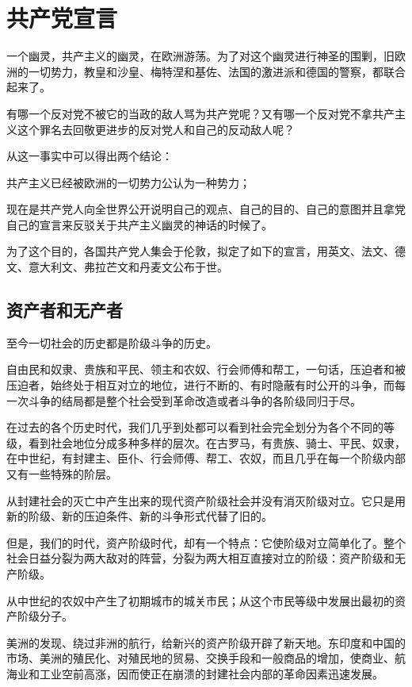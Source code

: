 
\usepackage{../../lectures_preamble}


    \section{共产党宣言}
    一个幽灵，共产主义的幽灵，在欧洲游荡。为了对这个幽灵进行神圣的围剿，旧欧洲的一切势力，教皇和沙皇、梅特涅和基佐、法国的激进派和德国的警察，都联合起来了。

    有哪一个反对党不被它的当政的敌人骂为共产党呢？又有哪一个反对党不拿共产主义这个罪名去回敬更进步的反对党人和自己的反动敌人呢？

    从这一事实中可以得出两个结论：

    共产主义已经被欧洲的一切势力公认为一种势力；

    现在是共产党人向全世界公开说明自己的观点、自己的目的、自己的意图并且拿党自己的宣言来反驳关于共产主义幽灵的神话的时候了。

    为了这个目的，各国共产党人集会于伦敦，拟定了如下的宣言，用英文、法文、德文、意大利文、弗拉芒文和丹麦文公布于世。
    \subsection{资产者和无产者}
    至今一切社会的历史都是阶级斗争的历史。

    自由民和奴隶、贵族和平民、领主和农奴、行会师傅和帮工，一句话，压迫者和被压迫者，始终处于相互对立的地位，进行不断的、有时隐蔽有时公开的斗争，而每一次斗争的结局都是整个社会受到革命改造或者斗争的各阶级同归于尽。

    在过去的各个历史时代，我们几乎到处都可以看到社会完全划分为各个不同的等级，看到社会地位分成多种多样的层次。在古罗马，有贵族、骑士、平民、奴隶，在中世纪，有封建主、臣仆、行会师傅、帮工、农奴，而且几乎在每一个阶级内部又有一些特殊的阶层。

    从封建社会的灭亡中产生出来的现代资产阶级社会并没有消灭阶级对立。它只是用新的阶级、新的压迫条件、新的斗争形式代替了旧的。

    但是，我们的时代，资产阶级时代，却有一个特点：它使阶级对立简单化了。整个社会日益分裂为两大敌对的阵营，分裂为两大相互直接对立的阶级：资产阶级和无产阶级。

    从中世纪的农奴中产生了初期城市的城关市民；从这个市民等级中发展出最初的资产阶级分子。

    美洲的发现、绕过非洲的航行，给新兴的资产阶级开辟了新天地。东印度和中国的市场、美洲的殖民化、对殖民地的贸易、交换手段和一般商品的增加，使商业、航海业和工业空前高涨，因而使正在崩溃的封建社会内部的革命因素迅速发展。

